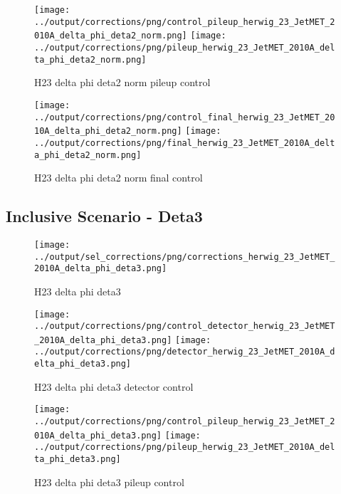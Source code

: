 \documentclass[11pt]{book}
\begin{document}
\begin{figure}[ht]
\centering
\texttt{[image: ../output/corrections/png/control\_pileup\_herwig\_23\_JetMET\_2010A\_delta\_phi\_deta2\_norm.png]}
\texttt{[image: ../output/corrections/png/pileup\_herwig\_23\_JetMET\_2010A\_delta\_phi\_deta2\_norm.png]}
\caption{H23 delta phi deta2 norm pileup control}
\label{fig:H23_JetMET_2010A_delta_phi_deta2_norm_pileup_control}
\end{figure}


\begin{figure}[ht]
\centering
\texttt{[image: ../output/corrections/png/control\_final\_herwig\_23\_JetMET\_2010A\_delta\_phi\_deta2\_norm.png]}
\texttt{[image: ../output/corrections/png/final\_herwig\_23\_JetMET\_2010A\_delta\_phi\_deta2\_norm.png]}
\caption{H23 delta phi deta2 norm final control}
\label{fig:H23_JetMET_2010A_delta_phi_deta2_norm_final_control}
\end{figure}


\clearpage
\subsection{Inclusive Scenario - Deta3}
\begin{figure}[ht]
\centering
\texttt{[image: ../output/sel\_corrections/png/corrections\_herwig\_23\_JetMET\_2010A\_delta\_phi\_deta3.png]}
\caption{H23 delta phi deta3}
\label{fig:H23_JetMET_2010A_delta_phi_deta3}
\end{figure}


\begin{figure}[ht]
\centering
\texttt{[image: ../output/corrections/png/control\_detector\_herwig\_23\_JetMET\_2010A\_delta\_phi\_deta3.png]}
\texttt{[image: ../output/corrections/png/detector\_herwig\_23\_JetMET\_2010A\_delta\_phi\_deta3.png]}
\caption{H23 delta phi deta3 detector control}
\label{fig:H23_JetMET_2010A_delta_phi_deta3_detector_control}
\end{figure}

\begin{figure}[ht]
\centering
\texttt{[image: ../output/corrections/png/control\_pileup\_herwig\_23\_JetMET\_2010A\_delta\_phi\_deta3.png]}
\texttt{[image: ../output/corrections/png/pileup\_herwig\_23\_JetMET\_2010A\_delta\_phi\_deta3.png]}
\caption{H23 delta phi deta3 pileup control}
\label{fig:H23_JetMET_2010A_delta_phi_deta3_pileup_control}
\end{figure}
\end{document}
